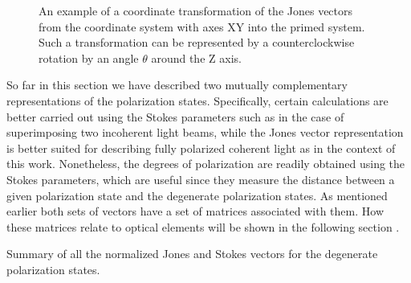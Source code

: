 \begin{figure}[h]
    \centering
    
    \caption{An example of a coordinate transformation of the Jones vectors from the coordinate system with axes XY into the primed system. Such a transformation can be represented by a counterclockwise rotation by an angle $\theta$ around the Z axis.}
    \label{fig:frame_rotation}
\end{figure}

So far in this section we have described two mutually complementary representations of the polarization states. Specifically, certain calculations are better carried out using the Stokes parameters such as in the case of superimposing two incoherent light beams, while the Jones vector representation is better suited for describing fully polarized coherent light as in the context of this work. Nonetheless, the degrees of polarization are readily obtained using the Stokes parameters, which are useful since they measure the distance between a given polarization state and the degenerate polarization states. As mentioned earlier both sets of vectors have a set of matrices associated with them. How these matrices relate to optical elements will be shown in the following section \cite{HechtOpticsEdition, GilPerez2017PolarizedApproach}.

\newpage

\begin{table}[H]
    \centering
    
    \caption{Summary of all the normalized Jones and Stokes vectors for the degenerate polarization states.}
    \label{tab:pol_statevectors}
\end{table}


